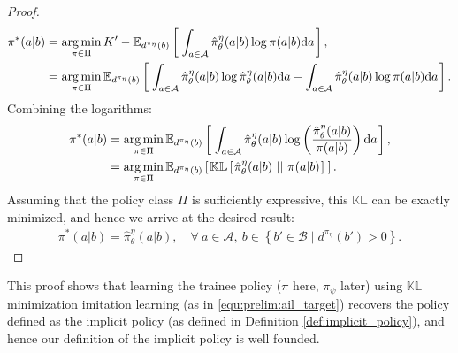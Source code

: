 \begin{proof}
\begin{align}
    \pi^*(a|b) &= \mathop{\operatorname{arg\,min}}_{\pi \in \Pi} K' - \mathbb{E}_{d^{\pi_{\eta}}(b)}\left[ \hspace*{0.1em}{}  \int_{a\in\mathcal{A}} \hat{\pi}_{\theta}^{\eta}(a | b) \log \pi(a | b)  \mathrm{d} a \hspace*{0.1em} \right]{} , \\
    &= \mathop{\operatorname{arg\,min}}_{\pi \in \Pi} \mathbb{E}_{d^{\pi_{\eta}}(b)}\left[ \hspace*{0.1em}{}  \int_{a\in\mathcal{A}} \hat{\pi}_{\theta}^{\eta}(a | b) \log \hat{\pi}_{\theta}^{\eta}(a | b)  \mathrm{d} a - \int_{a\in\mathcal{A}} \hat{\pi}_{\theta}^{\eta}(a | b) \log \pi(a | b) \mathrm{d} a \hspace*{0.1em} \right]{}  .
\end{align}
Combining the logarithms:
\begin{align}
    \pi^*(a|b) &= \mathop{\operatorname{arg\,min}}_{\pi \in \Pi} \mathbb{E}_{d^{\pi_{\eta}}(b)}\left[ \hspace*{0.1em}{}  \int_{a\in\mathcal{A}} \hat{\pi}_{\theta}^{\eta}(a | b) \log \left( \frac{\hat{\pi}_{\theta}^{\eta}(a | b)}{\pi(a | b)} \right) \mathrm{d} a \hspace*{0.1em} \right]{} ,\\
    &= \mathop{\operatorname{arg\,min}}_{\pi \in \Pi} \mathbb{E}_{d^{\pi_{\eta}}(b)}\left[ \hspace*{0.1em}{}  \mathbb{KL} \left[ \hspace*{0.1em}{}  \hat{\pi}_{\theta}^{\eta}(a | b) \ ||\ {} \pi(a | b) \hspace*{0.1em} \right]{}  \hspace*{0.1em} \right]{}  .
\end{align}
Assuming that the policy class $\Pi$ is sufficiently expressive, this $\mathbb{KL}$ can be exactly minimized, and hence we arrive at the desired result:
\begin{align}
    \pi^*(a | b) = \hat{\pi}_{\theta}^{\eta}(a | b), \quad \forall\ a \in \mathcal{A},\ b \in \left\lbrace b' \in \mathcal{B} \mid d^{\pi_{\eta}}(b') > 0 \right\rbrace.
\end{align}
\end{proof}
This proof shows that learning the trainee policy ($\pi$ here, $\pi_{\psi}$ later) using $\mathbb{KL}$ minimization imitation learning (as in \eqref{equ:prelim:ail_target}) recovers the policy defined as the implicit policy (as defined in Definition \ref{def:implicit_policy}), and hence our definition of the implicit policy is well founded. 

